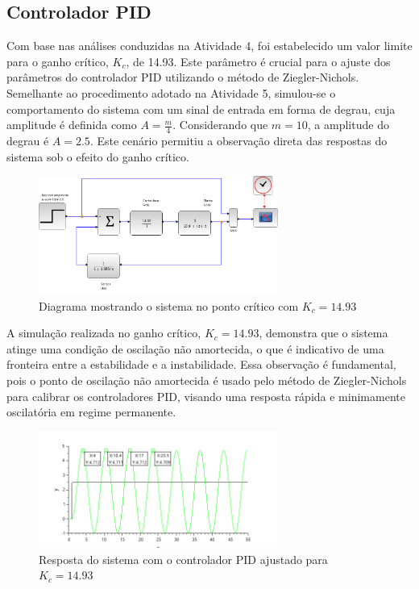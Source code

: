 \subsection{Controlador PID}

Com base nas análises conduzidas na Atividade 4, foi estabelecido um valor limite para o ganho crítico, \( K_c \), de 14.93. Este parâmetro é crucial para o ajuste dos parâmetros do controlador PID utilizando o método de Ziegler-Nichols. Semelhante ao procedimento adotado na Atividade 5, simulou-se o comportamento do sistema com um sinal de entrada em forma de degrau, cuja amplitude é definida como \( A = \frac{m}{4} \). Considerando que \( m = 10 \), a amplitude do degrau é \( A = 2.5 \). Este cenário permitiu a observação direta das respostas do sistema sob o efeito do ganho crítico.

\begin{figure}[H]
    \centering
    \includegraphics[width=0.7\textwidth]{atividades/6-atividade/assets/a/diagrama-ganho-critico-sistema-instavel.png}
    \caption{Diagrama mostrando o sistema no ponto crítico com \( K_c = 14.93 \)}
    \label{fig:diagrama-ponto-critico}
\end{figure}

A simulação realizada no ganho crítico, \( K_c = 14.93 \), demonstra que o sistema atinge uma condição de oscilação não amortecida, o que é indicativo de uma fronteira entre a estabilidade e a instabilidade. Essa observação é fundamental, pois o ponto de oscilação não amortecida é usado pelo método de Ziegler-Nichols para calibrar os controladores PID, visando uma resposta rápida e minimamente oscilatória em regime permanente.

\begin{figure}[H]
    \centering
    \includegraphics[width=0.7\textwidth]{atividades/6-atividade/assets/a/ganho-critico-sistema-instavel.png}
    \caption{Resposta do sistema com o controlador PID ajustado para \( K_c = 14.93 \)}
    \label{fig:ganho-critico-sistema-instavel}
\end{figure}


